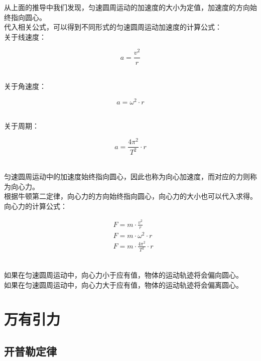 \documentclass[UTF8]{ctexart}
\begin{document}
\newpage

    从上面的推导中我们发现，匀速圆周运动的加速度的大小为定值，加速度的方向始终指向圆心。\\[4mm]
    代入相关公式，可以得到不同形式的匀速圆周运动加速度的计算公式：\\[3mm]
    关于线速度：
    \begin{large}
        \begin{equation*}
            a=\frac{v^2}{r}
        \end{equation*}
    \end{large}\\
    关于角速度：
    \begin{large}
        \begin{equation*}
            a=\omega^2\cdot r
        \end{equation*}
    \end{large}\\
    关于周期：
    \begin{large}
        \begin{equation*}
            a=\frac{4\pi^2}{T^2}\cdot r
        \end{equation*}
    \end{large}\\
    匀速圆周运动中的加速度始终指向圆心，因此也称为向心加速度，而对应的力则称为向心力。\\[8mm]
    根据牛顿第二定律，向心力的方向始终指向圆心，向心力的大小也可以代入求得。\\[3mm]
    向心力的计算公式：
    \begin{large}
        \begin{align*}
            &F=m\cdot \frac{v^2}{r}\\[5mm]
            &F=m\cdot\omega^2\cdot r\\[5mm]
            &F=m\cdot\frac{4\pi^2}{T^2}\cdot r
        \end{align*}
    \end{large}\\
    如果在匀速圆周运动中，向心力小于应有值，物体的运动轨迹将会偏向圆心。\\[3mm]
    如果在匀速圆周运动中，向心力大于应有值，物体的运动轨迹将会偏离圆心。
    
\newpage

\section{万有引力}

\subsection{开普勒定律}
\end{document}
